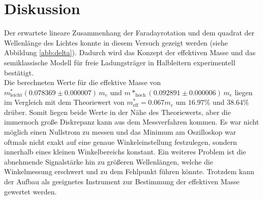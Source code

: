 \section{Diskussion}
\label{sec:Diskussion}
Der erwartete lineare Zusammenhang der Faradayrotation und dem quadrat der Wellenlänge des Lichtes konnte in diesem Versuch gezeigt werden (siehe Abbildung \ref{abb:delta}).
Dadurch wird das Konzept der effektiven Masse und das semiklassische Modell für freie Ladungsträger in Halbleitern experimentell bestätigt.
\\
Die berechneten Werte für die effektive Masse von $m^*_{\text{leicht}}(0.078369\pm 0.000007)\,m_e$ und $m*_{\text{hoch}}(0.092891\pm 0.000006)\,m_e$ 
liegen im Vergleich mit dem Theoriewert von $m^*_{\text{eff}}=0.067m_e$ \cite{meff} um $16.97\%$ und $38.64\%$ drüber.
Somit liegen beide Werte in der Nähe des Theoriewerts, aber die immernoch große Diskrepanz kann aus dem Messverfahren kommen.
Es war nicht möglich einen Nullstrom zu messen und das Minimum am Oszilloskop war oftmals nicht exakt auf eine genaue Winkeleinstellung festzulegen, sondern innerhalb eines kleinen Winkelbereichs konstant.
Ein weiteres Problem ist die abnehmende Signalstärke hin zu größeren Wellenlängen, welche die Winkelmessung erschwert und zu dem Fehlpunkt führen könnte.
Trotzdem kann der Aufbau als geeignetes Instrument zur Bestimmung der effektiven Masse gewertet werden.